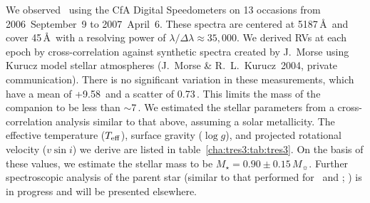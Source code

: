 We observed \tresThree\ using the CfA Digital Speedometers \citep{Latham:ASP:1992a} on 13 occasions from 2006~September~9 to 2007~April~6. 
These spectra are centered at 5187\,\AA\ and cover 45\,\AA\ with a resolving power of \mbox{$\lambda/\Delta\lambda \approx 35,\!000$}.
We derived RVs at each epoch by cross-correlation against synthetic spectra created by J.~Morse using Kurucz model stellar atmospheres (J.~Morse \& R.~L.~Kurucz~2004, private communication).
There is no significant variation in these measurements, which have a mean of \mbox{+9.58\,\kms} and a scatter of \mbox{0.73\,\kms}.
This limits the mass of the companion to be less than $\sim$7\,\mjup.
We estimated the stellar parameters from a cross-correlation analysis similar to that above, assuming a solar metallicity.
The effective temperature ($T_{\rm eff}$), surface gravity ($\log g$), and projected rotational velocity ($v \sin i$) we derive are listed in table~\ref{cha:tres3:tab:tres3}.
On the basis of these values, we estimate the stellar mass to be $M_{\star}=0.90\pm0.15\,M_{\sun}$.
Further spectroscopic analysis of the parent star (similar to that performed for \tresOne\ and \tresTwo; \citealt{Sozzetti_Yong_Torres:apjl:2004a, Sozzetti_Torres_Charbonneau:apj:2007a}) is in progress and will be presented elsewhere.

